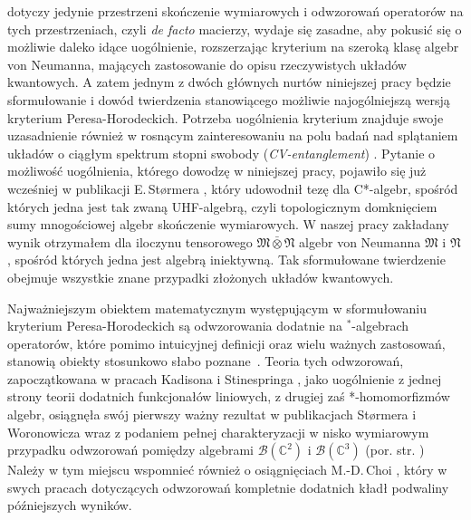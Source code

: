 dotyczy jedynie przestrzeni skończenie wymiarowych i odwzorowań operatorów
na tych przestrzeniach,
czyli \emph{de facto} macierzy,
wydaje się zasadne,
aby pokusić się o możliwie daleko idące uogólnienie,
rozszerzając kryterium na szeroką klasę algebr von Neumanna,
mających zastosowanie do opisu rzeczywistych układów kwantowych.
A zatem jednym z dwóch głównych nurtów niniejszej pracy będzie sformułowanie
i dowód twierdzenia stanowiącego możliwie najogólniejszą wersją
kryterium Peresa-Horodeckich.
Potrzeba uogólnienia kryterium znajduje swoje uzasadnienie również
w rosnącym zainteresowaniu na polu badań nad splątaniem układów o ciągłym
spektrum stopni swobody (\emph{CV-entanglement})
\cite{adesso2007entanglement}.
Pytanie o możliwość uogólnienia, którego dowodzę w niniejszej pracy,
pojawiło się już wcześniej w publikacji E.\,St{\o}rmera
\cite{stormer2008separable},
który udowodnił tezę dla C*-algebr,
spośród których jedna jest tak zwaną UHF-algebrą,
czyli topologicznym domknięciem sumy mnogościowej algebr skończenie wymiarowych.
W naszej pracy zakładany wynik otrzymałem dla iloczynu tensorowego
$\mathfrak{M} \bar{\otimes} \mathfrak{N}$
algebr von Neumanna $\mathfrak{M}$ i $\mathfrak{N}$,
spośród których jedna jest algebrą iniektywną.
Tak sformułowane twierdzenie obejmuje wszystkie znane
przypadki złożonych układów kwantowych.

Najważniejszym obiektem matematycznym występującym w sformułowaniu
kryterium Peresa-Horodeckich są odwzorowania dodatnie na $^{*}$-algebrach operatorów,
które pomimo intuicyjnej definicji oraz wielu ważnych zastosowań,
stanowią obiekty stosunkowo słabo
\mbox{poznane \cite{Stormer2013}}.
Teoria tych odwzorowań, zapoczątkowana w pracach
Kadisona \cite{kadison1952generalized}
i Stinespringa
\cite{stinespring1955positive},
jako uogólnienie z jednej strony teorii dodatnich funkcjonałów liniowych,
z drugiej zaś *-homomorfizmów algebr,
osiągnęła swój pierwszy ważny rezultat w publikacjach Størmera i Woronowicza
\cite{stormer1963positive,woronowicz1976positive}
wraz z podaniem pełnej charakteryzacji w nisko wymiarowym przypadku
odwzorowań pomiędzy algebrami $\mathcal{B}(\mathbb{C}^{2})$ i $\mathcal{B}(\mathbb{C}^{3})$
(por. str. \pageref{thm:PositiveMapsOnM2})
Należy w tym miejscu wspomnieć również o osiągnięciach M.-D.\,Choi
\cite{choi1975completely,choi1975positive,choi1980some,choi1977extremal},
który w swych pracach dotyczących odwzorowań kompletnie dodatnich
kładł podwaliny późniejszych wyników.

